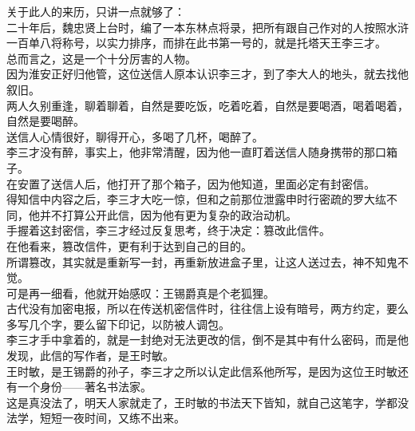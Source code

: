 \begin{multicols}{\theparacolNo}
关于此人的来历，只讲一点就够了：\\

二十年后，魏忠贤上台时，编了一本东林点将录，把所有跟自己作对的人按照水浒一百单八将称号，以实力排序，而排在此书第一号的，就是托塔天王李三才。\\

总而言之，这是一个十分厉害的人物。\\

因为淮安正好归他管，这位送信人原本认识李三才，到了李大人的地头，就去找他叙旧。\\

两人久别重逢，聊着聊着，自然是要吃饭，吃着吃着，自然是要喝酒，喝着喝着，自然是要喝醉。\\

送信人心情很好，聊得开心，多喝了几杯，喝醉了。\\

李三才没有醉，事实上，他非常清醒，因为他一直盯着送信人随身携带的那口箱子。\\

在安置了送信人后，他打开了那个箱子，因为他知道，里面必定有封密信。\\

得知信中内容之后，李三才大吃一惊，但和之前那位泄露申时行密疏的罗大纮不同，他并不打算公开此信，因为他有更为复杂的政治动机。\\

手握着这封密信，李三才经过反复思考，终于决定：篡改此信件。\\

在他看来，篡改信件，更有利于达到自己的目的。\\

所谓篡改，其实就是重新写一封，再重新放进盒子里，让这人送过去，神不知鬼不觉。\\

可是再一细看，他就开始感叹：王锡爵真是个老狐狸。\\

古代没有加密电报，所以在传送机密信件时，往往信上设有暗号，两方约定，要么多写几个字，要么留下印记，以防被人调包。\\

李三才手中拿着的，就是一封绝对无法更改的信，倒不是其中有什么密码，而是他发现，此信的写作者，是王时敏。\\

王时敏，是王锡爵的孙子，李三才之所以认定此信系他所写，是因为这位王时敏还有一个身份——著名书法家。\\

这是真没法了，明天人家就走了，王时敏的书法天下皆知，就自己这笔字，学都没法学，短短一夜时间，又练不出来。\\


\end{multicols}
